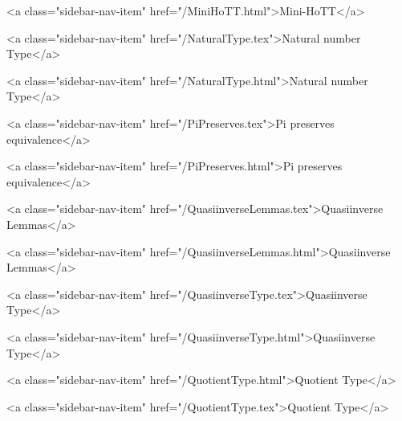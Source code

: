       
        
          <a class="sidebar-nav-item" href="/MiniHoTT.html">Mini-HoTT</a>
        
      
    
      
        
          <a class="sidebar-nav-item" href="/NaturalType.tex">Natural number Type</a>
        
      
    
      
        
          <a class="sidebar-nav-item" href="/NaturalType.html">Natural number Type</a>
        
      
    
      
        
          <a class="sidebar-nav-item" href="/PiPreserves.tex">Pi preserves equivalence</a>
        
      
    
      
        
          <a class="sidebar-nav-item" href="/PiPreserves.html">Pi preserves equivalence</a>
        
      
    
      
        
          <a class="sidebar-nav-item" href="/QuasiinverseLemmas.tex">Quasiinverse Lemmas</a>
        
      
    
      
        
          <a class="sidebar-nav-item" href="/QuasiinverseLemmas.html">Quasiinverse Lemmas</a>
        
      
    
      
        
          <a class="sidebar-nav-item" href="/QuasiinverseType.tex">Quasiinverse Type</a>
        
      
    
      
        
          <a class="sidebar-nav-item" href="/QuasiinverseType.html">Quasiinverse Type</a>
        
      
    
      
        
          <a class="sidebar-nav-item" href="/QuotientType.html">Quotient Type</a>
        
      
    
      
        
          <a class="sidebar-nav-item" href="/QuotientType.tex">Quotient Type</a>
        
